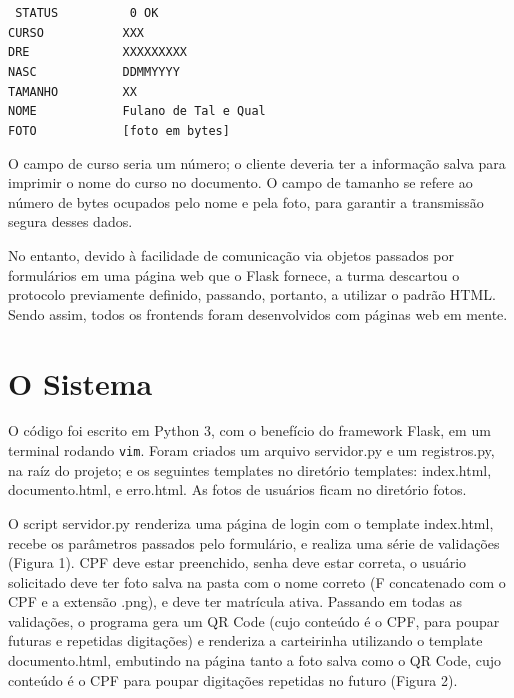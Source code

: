 \documentclass[12pt]{article}
\def\code #1{\texttt{#1}}
\def\codeIndent{60pt}
\begin{document}
\noindent\code{
\hspace*{\codeIndent}STATUS\ \ \ \ \ \ \ \ \ \ 0\ OK\\
\hspace*{\codeIndent} CURSO\ \ \ \ \ \ \ \ \ \ \ XXX\\
\hspace*{\codeIndent} DRE\ \ \ \ \ \ \ \ \ \ \ \ \ XXXXXXXXX\\
\hspace*{\codeIndent} NASC\ \ \ \ \ \ \ \ \ \ \ \ DDMMYYYY\\
\hspace*{\codeIndent} TAMANHO	\ \ \ \ \ \ \ \ XX\\
\hspace*{\codeIndent} NOME\ \ \ \ \ \ \ \ \ \ \ \ Fulano de Tal e Qual\\
\hspace*{\codeIndent} FOTO\ \ \ \ \ \ \ \ \ \ \ \ [foto em bytes]\\
}	

O campo de curso seria um número; o cliente deveria ter a informação salva para imprimir o nome do curso no documento. O campo de tamanho se refere ao número de bytes ocupados pelo nome e pela foto, para garantir a transmissão segura desses dados.
	
No entanto, devido à facilidade de comunicação via objetos passados por formulários em uma página web que o Flask fornece, a turma descartou o protocolo previamente definido, passando, portanto, a utilizar o padrão HTML. Sendo assim, todos os frontends foram desenvolvidos com páginas web em mente.

\section{O Sistema}

O código foi escrito em Python 3, com o benefício do framework Flask, em um terminal rodando \code{vim}. Foram criados um arquivo servidor.py e um registros.py, na raíz do projeto; e os seguintes templates no diretório templates: index.html, documento.html, e erro.html. As fotos de usuários ficam no diretório fotos.

O script servidor.py renderiza uma página de login com o template index.html, recebe os parâmetros passados pelo formulário, e realiza uma série de validações (Figura 1). CPF deve estar preenchido, senha deve estar correta, o usuário solicitado deve ter foto salva na pasta com o nome correto (F concatenado com o CPF e a extensão .png), e deve ter matrícula ativa. Passando em todas as validações, o programa gera um QR Code (cujo conteúdo é o CPF, para poupar futuras e repetidas digitações) e renderiza a carteirinha utilizando o template documento.html, embutindo na página tanto a foto salva como o QR Code, cujo conteúdo é o CPF para poupar digitações repetidas no futuro (Figura 2).
\end{document}
